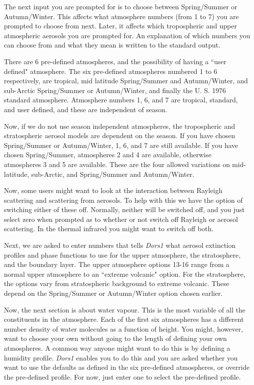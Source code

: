 \documentclass[12pt]{article}
\begin{document}
The next input you are prompted for is to choose between Spring/Summer or Autumn/Winter. 
This affects what atmosphere numbers
(from 1 to 7) you are prompted to choose from next. Later, it affects which tropospheric and
upper atmospheric aerosols you are prompted for. An explanation of which numbers you can choose
from and what they mean is written to the standard output.


There are  6 pre-defined atmospheres,  and the possibility of having a ``user defined" atmosphere.
The six pre-defined atmospheres numbered 1 to 6 respectively, are tropical, mid latitude Spring/Summer and Autumn/Winter, and 
sub-Arctic Spring/Summer or Autumn/Winter, and finally
the U. S. 1976 standard atmosphere. 
Atmosphere numbers 1, 6, and 7 are tropical, standard, and user defined, and these are independent of season.

Now, if we do not use season independent atmospheres, the tropospheric 
and stratospheric aerosol models are dependent on the season.
 If you have chosen Spring/Summer or Autumn/Winter, 1, 6, and 7 are still available. 
 If you have chosen
Spring/Summer, atmospheres 2 and 4 are available, otherwise atmospheres 3 and 5 are available.
These are the four allowed variations on mid-latitude, sub-Arctic, and Spring/Summer and Autumn/Winter.

Now, some users might want to look at the interaction 
 between Rayleigh scattering and scattering from aerosols. To help with this we have the option
of switching either of these off. Normally, neither will be switched off, and you just select
zero when prompted as to  whether or not switch off Rayleigh or aerosol scattering. In the thermal
infrared you might want to switch off both.

Next, we are asked to enter numbers that tells {\it Dors1} what aerosol extinction profiles
and phase functions to use for the upper atmosphere, the stratosphere, and the boundary layer.
The upper atmosphere options 13-16 range from a normal upper atmosphere to an ``extreme volcanic"
option. For the stratosphere, the options vary from stratospheric background to extreme volcanic.
These depend on the Spring/Summer or Autumn/Winter option chosen earlier.

Now, the next section is about water vapour. This is the most variable of all the
constituents in the atmosphere.  Each of the first six atmospheres has a different number
density of water molecules as a function of height. You might, however, want to choose your
own without going to the length of defining your own atmospheres.  A common way anyone
might want to do this is by defining a humidity profile. {\it Dors1} enables you to do 
this and you are asked whether you want to use the defaults as defined in the six pre-defined
atmospheres, or override the pre-defined profile. For now, just enter one to select the
pre-defined profile.
\end{document}
